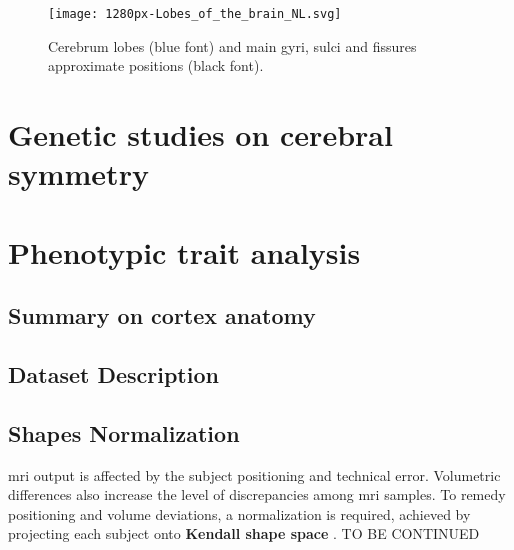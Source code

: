 \begin{figure}
\centering
\texttt{[image: 1280px-Lobes\_of\_the\_brain\_NL.svg]}
\caption[A crude cerebrum partitioning]{Cerebrum lobes (blue font) and main gyri, sulci and fissures approximate positions (black font).}
\label{fig:lobes}
\end{figure}


%		
%		

\section{Genetic studies on cerebral symmetry}






\section{Phenotypic trait analysis}\label{sec:phenotype_intro}
\subsection{Summary on cortex anatomy}
 
\subsection{Dataset Description}
 
\subsection{Shapes Normalization}
\Ac{mri} output is affected by the subject positioning and technical error.  Volumetric differences also increase the level of discrepancies among \ac{mri} samples. To remedy positioning and volume deviations, a normalization is required, achieved by projecting each subject onto \textbf{Kendall shape space} \cite{Klingenberg2020}. TO BE CONTINUED

